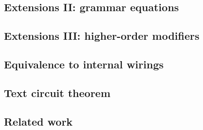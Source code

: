\begin{example}

\end{example}


\begin{example}

\end{example}


\begin{example}

\end{example}

\subsection{Extensions II: grammar equations}


\begin{example}

\end{example}


\begin{example}

\end{example}


\begin{example}

\end{example}

\subsection{Extensions III: higher-order modifiers}


\begin{example}

\end{example}


\begin{example}

\end{example}

\subsection{Equivalence to internal wirings}

\subsection{Text circuit theorem}

\subsection{Related work}